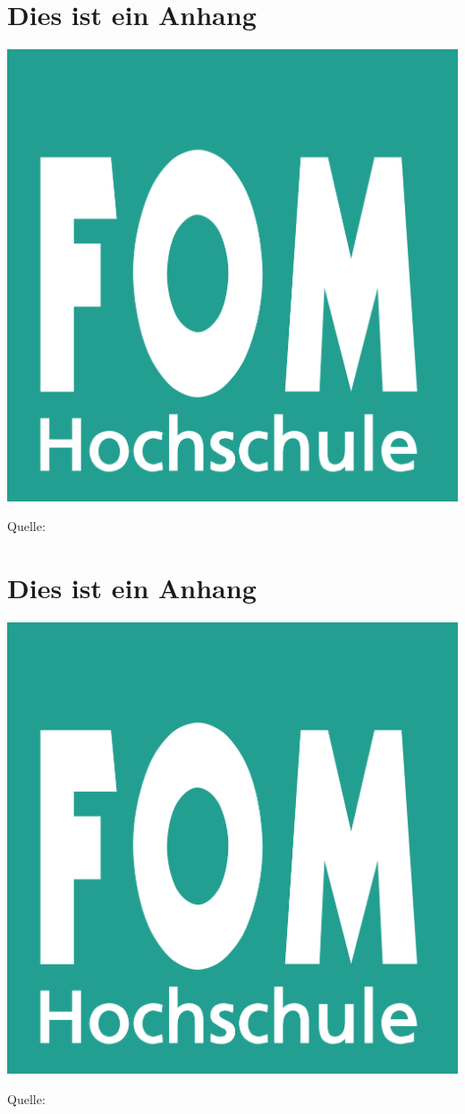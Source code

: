 
\renewcommand\thesection{Anhang \arabic{section}:} %

\begin{minipage}{\textwidth}
	\section{Dies ist ein Anhang}
	\label{anh:beispiel}
	\includegraphics[width=0.5\linewidth]{Abbildungen/fom_logo.png} 
	\par\smallskip
	Quelle: \cite{logo}
\end{minipage}

\begin{minipage}{\textwidth}
	\section{Dies ist ein Anhang}
	\label{anh:beispiel2}
	\includegraphics[width=0.5\linewidth]{Abbildungen/fom_logo.png} 
	\par\smallskip
	Quelle: \cite{logo}
\end{minipage}

\renewcommand\thesection{\thechapter.\arabic{section}}
